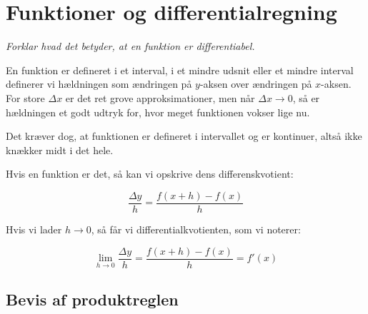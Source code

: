 
\section{Funktioner og differentialregning}


\emph{Forklar hvad det betyder, at en funktion er differentiabel.}


En funktion er defineret i et interval, i et mindre udsnit
eller et mindre interval definerer vi hældningen
som ændringen på $y$-aksen over ændringen på $x$-aksen.
For store $\Delta x$ er det ret grove approksimationer,
men når $\Delta x \rightarrow 0$, så er hældningen
et godt udtryk for, hvor meget funktionen vokser lige nu.

Det kræver dog, at funktionen er defineret i intervallet
og er kontinuer, altså ikke knækker midt i det hele.

Hvis en funktion er det, så kan vi opskrive dens differenskvotient:

$$
    \frac{\Delta y}{h}=\frac{f(x+h)-f(x)}{h}
$$

Hvis vi lader $h \rightarrow 0$, så får vi differentialkvotienten, som vi noterer:

$$
    \lim_{h \rightarrow 0}     \frac{\Delta y}{h}=\frac{f(x+h)-f(x)}{h}
    =f'(x)
$$

\subsection{Bevis af produktreglen}

